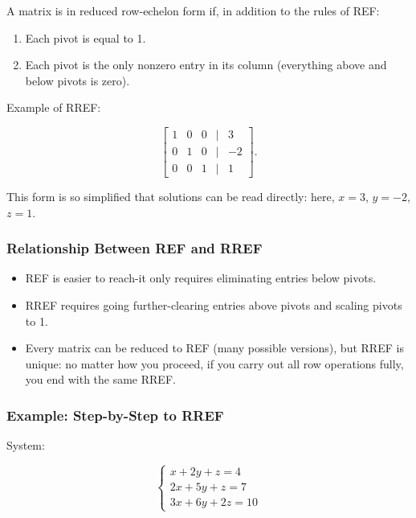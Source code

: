 \documentclass[
  letterpaper,
  DIV=11,
  numbers=noendperiod]{scrreprt}
\providecommand{\tightlist}{%
  \setlength{\itemsep}{0pt}\setlength{\parskip}{0pt}}
\begin{document}
A matrix is in reduced row-echelon form if, in addition to the rules of
REF:

\begin{enumerate}
\def\labelenumi{\arabic{enumi}.}
\tightlist
\item
  Each pivot is equal to 1.
\item
  Each pivot is the only nonzero entry in its column (everything above
  and below pivots is zero).
\end{enumerate}

Example of RREF:

\[
\begin{bmatrix}  
1 & 0 & 0 & | & 3 \\  
0 & 1 & 0 & | & -2 \\  
0 & 0 & 1 & | & 1  
\end{bmatrix}.
\]

This form is so simplified that solutions can be read directly: here,
\(x=3\), \(y=-2\), \(z=1\).

\subsubsection{Relationship Between REF and
RREF}\label{relationship-between-ref-and-rref}

\begin{itemize}
\tightlist
\item
  REF is easier to reach-it only requires eliminating entries below
  pivots.
\item
  RREF requires going further-clearing entries above pivots and scaling
  pivots to 1.
\item
  Every matrix can be reduced to REF (many possible versions), but RREF
  is unique: no matter how you proceed, if you carry out all row
  operations fully, you end with the same RREF.
\end{itemize}

\subsubsection{Example: Step-by-Step to
RREF}\label{example-step-by-step-to-rref}

System:

\[
\begin{cases}  
x + 2y + z = 4 \\  
2x + 5y + z = 7 \\  
3x + 6y + 2z = 10  
\end{cases}
\]
\end{document}
